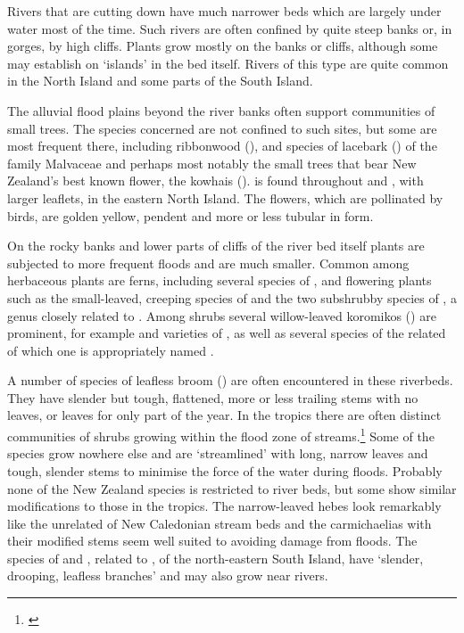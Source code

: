Rivers that are cutting down have much narrower beds which are largely under water most of the time.
Such rivers are often confined by quite steep banks or, in gorges, by high cliffs.
Plants grow mostly on the banks or cliffs, although some may establish on `islands' in the bed itself.
Rivers of this type are quite common in the North Island and some parts of the South Island.

The alluvial flood plains beyond the river banks often support communities of small trees.
The species concerned are not confined to such sites, but some are most frequent there, including ribbonwood (), and species of lacebark () of the family Malvaceae and perhaps most notably the small trees that bear New Zealand's best known flower, the kowhais ().   is found throughout and , with larger leaflets, in the eastern North Island.
The flowers, which are pollinated by birds, are golden yellow, pendent and more or less tubular in form.

On the rocky banks and lower parts of cliffs of the river bed itself plants are subjected to more frequent floods and are much smaller.
Common among herbaceous plants are ferns, including several species of , and flowering plants such as the small-leaved, creeping species of  and the two subshrubby species of , a genus closely related to .
Among shrubs several willow-leaved koromikos () are prominent, for example  and varieties of , as well as several species of the related  of which one is appropriately named .

A number of species of leafless broom () are often encountered in these riverbeds.
They have slender but tough, flattened, more or less trailing stems with no leaves, or leaves for only part of the year.
In the tropics there are often distinct communities of shrubs growing within the flood zone of streams.\footnote{\cite{ansteenis1981rheophytes}}
Some of the species grow nowhere else and are `streamlined' with long, narrow leaves and tough, slender stems to minimise the force of the water during floods.
Probably none of the New Zealand species is restricted to river beds, but some show similar modifications to those in the tropics.
The narrow-leaved hebes look remarkably like the unrelated  of New Caledonian stream beds and the carmichaelias with their modified stems seem well suited to avoiding damage from floods.
The species of  and , related to , of the north-eastern South Island, have `slender, drooping, leafless branches' and may also grow near rivers.

